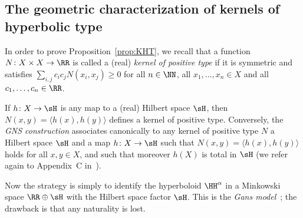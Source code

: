 \subsection{The geometric characterization of kernels of hyperbolic type}\label{sec:KHT-KPT}

In order to prove Proposition~\ref{prop:KHT}, we recall that a function $N\colon X\times X\to\RR$ is called a (real) \emph{kernel of positive type} if it is symmetric and satisfies $\sum_{i,j} c_i c_j N(x_i, x_j)\geq 0$ for all $n\in \NN$, all $x_1, \ldots, x_n\in X$ and all $c_1, \ldots, c_n\in \RR$.

If $h\colon X\to \sH$ is any map to a (real) Hilbert space $\sH$, then $N(x,y)=\langle h(x), h(y)\rangle$ defines a kernel of positive type. Conversely, the \emph{GNS construction} associates canonically to any kernel of positive type $N$ a Hilbert space $\sH$ and a map $h\colon X\to \sH$ such that $N(x,y)=\langle h(x), h(y)\rangle$ holds for all $x,y\in X$, and such that moreover $h(X)$ is total in $\sH$ (we refer again to Appendix~C in~\cite{Bekka-Harpe-Valette}).

Now the strategy is simply to identify the hyperboloid $\HH^\alpha$ in a Minkowski space $\RR\oplus \sH$ with the Hilbert space factor $\sH$. This is the \emph{Gans model}~\cite{Gans66}; the drawback is that any naturality is lost.

